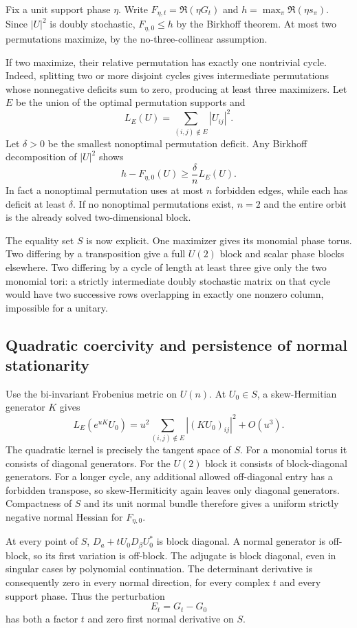 \documentclass[11pt]{article}
\begin{document}
Fix a unit support phase $\eta$. Write $F_{\eta,t}=\Re(\eta G_t)$ and $h=\max_\pi\Re(\eta s_\pi)$. Since $|U|^2$ is doubly stochastic, $F_{\eta,0}\le h$ by the Birkhoff theorem. At most two permutations maximize, by the no-three-collinear assumption.

If two maximize, their relative permutation has exactly one nontrivial cycle. Indeed, splitting two or more disjoint cycles gives intermediate permutations whose nonnegative deficits sum to zero, producing at least three maximizers. Let $E$ be the union of the optimal permutation supports and
\[
L_E(U)=\sum_{(i,j)\notin E}|U_{ij}|^2.
\]
Let $\delta>0$ be the smallest nonoptimal permutation deficit. Any Birkhoff decomposition of $|U|^2$ shows
\begin{equation}\label{leak}
h-F_{\eta,0}(U)\ge\frac{\delta}{n}L_E(U).
\end{equation}
In fact a nonoptimal permutation uses at most $n$ forbidden edges, while each has deficit at least $\delta$. If no nonoptimal permutations exist, $n=2$ and the entire orbit is the already solved two-dimensional block.

The equality set $S$ is now explicit. One maximizer gives its monomial phase torus. Two differing by a transposition give a full $U(2)$ block and scalar phase blocks elsewhere. Two differing by a cycle of length at least three give only the two monomial tori: a strictly intermediate doubly stochastic matrix on that cycle would have two successive rows overlapping in exactly one nonzero column, impossible for a unitary.

\subsection{Quadratic coercivity and persistence of normal stationarity}
Use the bi-invariant Frobenius metric on $U(n)$. At $U_0\in S$, a skew-Hermitian generator $K$ gives
\[
L_E(e^{uK}U_0)=u^2\sum_{(i,j)\notin E}|(KU_0)_{ij}|^2+O(u^3).
\]
The quadratic kernel is precisely the tangent space of $S$. For a monomial torus it consists of diagonal generators. For the $U(2)$ block it consists of block-diagonal generators. For a longer cycle, any additional allowed off-diagonal entry has a forbidden transpose, so skew-Hermiticity again leaves only diagonal generators. Compactness of $S$ and its unit normal bundle therefore gives a uniform strictly negative normal Hessian for $F_{\eta,0}$.

At every point of $S$, $D_a+tU_0D_\beta U_0^*$ is block diagonal. A normal generator is off-block, so its first variation is off-block. The adjugate is block diagonal, even in singular cases by polynomial continuation. The determinant derivative is consequently zero in every normal direction, for every complex $t$ and every support phase. Thus the perturbation
\[
E_t=G_t-G_0
\]
has both a factor $t$ and zero first normal derivative on $S$.
\end{document}

